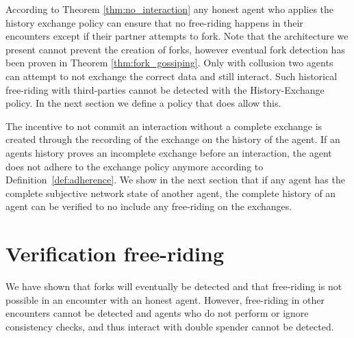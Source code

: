 
According to Theorem \ref{thm:no_interaction} any honest agent who applies the history exchange policy
can ensure that no free-riding happens in their encounters except if their partner attempts to fork. 
Note that the architecture we present cannot prevent the creation of forks, however eventual fork
detection has been proven in Theorem \ref{thm:fork_gossiping}. Only with collusion two agents can 
attempt to not exchange the correct data and still interact.
Such historical free-riding with third-parties cannot be detected with the History-Exchange policy.
In the next section we define a policy that does allow this.

The incentive to not commit an interaction without a complete exchange is created through the 
recording of the exchange on the history of the agent. If an agents history proves an incomplete exchange 
before an interaction, the agent does not adhere to the exchange policy anymore according to 
Definition~\ref{def:adherence}. We show in the next section that if any agent has the complete subjective network state 
of another agent, the complete history of an agent can be verified to no include any free-riding 
on the exchanges.

\section{Verification free-riding}
\label{sec:verification_free-riding}
We have shown that forks will eventually be detected and that free-riding is not possible in an 
encounter with an honest agent. However, free-riding in other encounters cannot be detected and 
agents who do not perform or ignore consistency checks, and thus interact with double spender cannot
be detected. 


